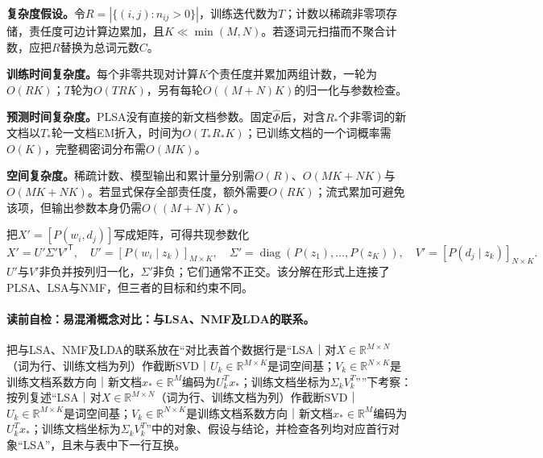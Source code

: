 \begin{complexitybox}
\textbf{复杂度假设。}令$R=|\{(i,j):n_{ij}>0\}|$，训练迭代数为$T$；计数以稀疏非零项存储，责任度可边计算边累加，且$K\ll\min(M,N)$。若逐词元扫描而不聚合计数，应把$R$替换为总词元数$C$。

\textbf{训练时间复杂度。}每个非零共现对计算$K$个责任度并累加两组计数，一轮为$O(RK)$；$T$轮为$O(TRK)$，另有每轮$O((M+N)K)$的归一化与参数检查。

\textbf{预测时间复杂度。}PLSA没有直接的新文档参数。固定$\widehat\Phi$后，对含$R_*$个非零词的新文档以$T_*$轮一文档EM折入，时间为$O(T_*R_*K)$；已训练文档的一个词概率需$O(K)$，完整稠密词分布需$O(MK)$。

\textbf{空间复杂度。}稀疏计数、模型输出和累计量分别需$O(R)$、$O(MK+NK)$与$O(MK+NK)$。若显式保存全部责任度，额外需要$O(RK)$；流式累加可避免该项，但输出参数本身仍需$O((M+N)K)$。
\end{complexitybox}

把$X'=[P(w_i,d_j)]$写成矩阵，可得共现参数化
\[
X'=U'\Sigma'V'^{\mathsf T},\quad
U'=[P(w_i\mid z_k)]_{M\times K},\quad
\Sigma'=\operatorname{diag}(P(z_1),\ldots,P(z_K)),\quad
V'=[P(d_j\mid z_k)]_{N\times K}.
\]
$U'$与$V'$非负并按列归一化，$\Sigma'$非负；它们通常不正交。该分解在形式上连接了PLSA、LSA与NMF，但三者的目标和约束不同。

\paragraph{读前自检：易混淆概念对比：与LSA、NMF及LDA的联系。}把与LSA、NMF及LDA的联系放在“对比表首个数据行是“LSA｜对$X\in\mathbb R^{M\times N}$（词为行、训练文档为列）作截断SVD｜$U_k\in\mathbb R^{M\times K}$是词空间基；$V_k\in\mathbb R^{N\times K}$是训练文档系数方向｜新文档$x_*\in\mathbb R^M$编码为$U_k^Tx_*$；训练文档坐标为$\Sigma_kV_k^T$””下考察：按列复述“LSA｜对$X\in\mathbb R^{M\times N}$（词为行、训练文档为列）作截断SVD｜$U_k\in\mathbb R^{M\times K}$是词空间基；$V_k\in\mathbb R^{N\times K}$是训练文档系数方向｜新文档$x_*\in\mathbb R^M$编码为$U_k^Tx_*$；训练文档坐标为$\Sigma_kV_k^T$”中的对象、假设与结论，并检查各列均对应首行对象“LSA”，且未与表中下一行互换。\par

